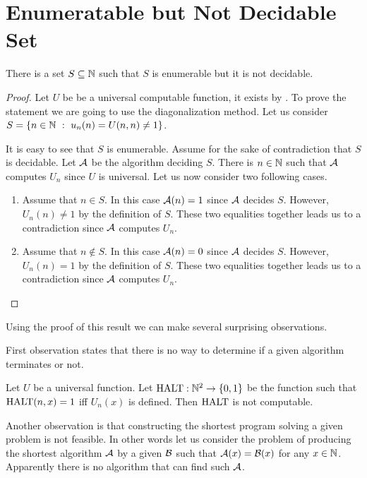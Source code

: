 \section{Enumeratable but Not Decidable Set}
\begin{theorem}
  There is a set $S \subseteq {\mathbb{N}}$ such that $S$ is enumerable but it is not
  decidable.
\end{theorem}
\begin{proof}
  Let $U$ be be a universal computable function, it exists by
  .
  To prove the statement we are going to use the diagonalization method.
  Let us consider $S = \set[u_n(n) = U(n, n) \neq 1]{n \in \N}$.

  It is easy to see that $S$ is enumerable. Assume for the sake of
  contradiction that $S$ is decidable. Let $\mathcal{A}$ be the algorithm
  deciding $S$. There is $n \in {\mathbb{N}}$ such that $\mathcal{A}$ computes $U_n$
  since $U$ is universal. Let us now consider two following cases.
  \begin{enumerate}
    \item Assume that $n \in S$. In this case $\mathcal{A}(n) = 1$ since
      $\mathcal{A}$ decides $S$. However, $U_n(n) \neq 1$ by the definition of
      $S$. These two equalities together leads us to a contradiction since
      $\mathcal{A}$ computes $U_n$.
    \item Assume that $n \notin S$. In this case $\mathcal{A}(n) = 0$ since
      $\mathcal{A}$ decides $S$. However, $U_n(n) = 1$ by the definition of
      $S$. These two equalities together leads us to a contradiction since
      $\mathcal{A}$ computes $U_n$.
  \end{enumerate}
\end{proof}

Using the proof of this result we can make several surprising observations.

First observation states that there is no way to determine if a given
algorithm terminates or not.
\begin{theorem}
  Let $U$ be a universal function.
  Let $\Halting : \N^2 \to \set{0, 1}$ be the function such that
  $\mathrm{HALT}(n, x) = 1$ iff $U_n(x)$ is defined. Then $\mathrm{HALT}$ is not
  computable.
\end{theorem}

Another observation is that constructing the shortest program solving a given
problem is not feasible.
In other words let us consider the problem of producing the shortest algorithm
$\mathcal{A}$ by a given $\mathcal{B}$ such that
$\mathcal{A}(x) = \mathcal{B}(x)$ for any $x \in {\mathbb{N}}$. Apparently there is
no algorithm that can find such $\mathcal{A}$.

